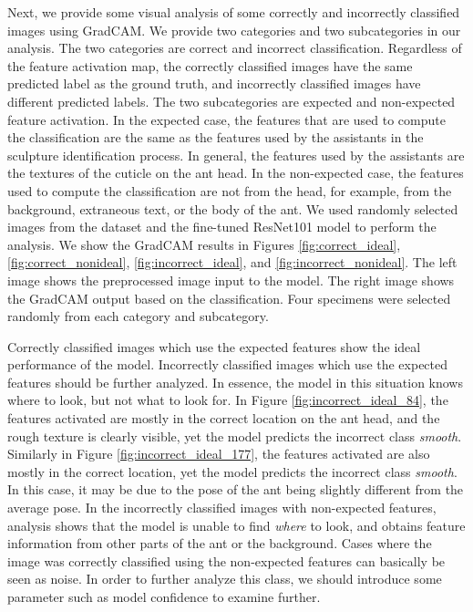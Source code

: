 \documentclass{aci}
\numberwithin{equation}{section}
\begin{document}

Next, we provide some visual analysis of some correctly and
incorrectly classified images using GradCAM. We provide two categories and two
subcategories in our analysis. The two categories are correct and incorrect
classification. Regardless of the feature activation map, the correctly
classified images have the same predicted label as the ground truth, and
incorrectly classified images have different predicted labels. The two
subcategories are expected and non-expected feature activation. In the expected
case, the features that are used to compute the classification are the same as
the features used by the assistants in the sculpture identification process. In
general, the features used by the assistants are the textures of the cuticle on
the ant head. In the non-expected case, the features used to compute the
classification are not from the head, for example, from the background,
extraneous text, or the body of the ant. We used randomly selected images from
the dataset and the fine-tuned ResNet101 model to perform the analysis. We show
the GradCAM results in Figures \ref{fig:correct_ideal},
\ref{fig:correct_nonideal}, \ref{fig:incorrect_ideal}, and
\ref{fig:incorrect_nonideal}. The left image shows the preprocessed image input
to the model. The right image shows the GradCAM output based on the
classification. Four specimens were selected randomly from each category and
subcategory.

Correctly classified images which use the expected features show the ideal
performance of the model. Incorrectly classified images which use the expected
features should be further analyzed. In essence, the model in this situation
knows where to look, but not what to look for. In Figure
\ref{fig:incorrect_ideal_84}, the features activated are mostly in the correct
location on the ant head, and the rough texture is clearly visible, yet the
model predicts the incorrect class \textit{smooth}. Similarly in Figure
\ref{fig:incorrect_ideal_177}, the features activated are also mostly in the
correct location, yet the model predicts the incorrect class \textit{smooth}. In
this case, it may be due to the pose of the ant being slightly different from
the average pose. In the incorrectly classified images with non-expected
features, analysis shows that the model is unable to find \textit{where} to
look, and obtains feature information from other parts of the ant or the
background. Cases where the image was correctly classified using the
non-expected features can basically be seen as noise. In order to further
analyze this class, we should introduce some parameter such as model confidence
to examine further.
\end{document}
